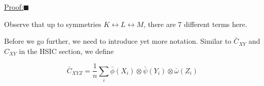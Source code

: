 \documentclass[12pt]{article}
\newenvironment{claimproof}[1]{\par\noindent\underline{Proof:}\space#1}{\hfill $\blacksquare$}
\numberwithin{claim}{section}
\numberwithin{lemma}{section}
\numberwithin{theorem}{section}
\begin{document}
\begin{claimproof}
%
%
\end{claimproof}


Observe that up to symmetries $K\leftrightarrow L \leftrightarrow M$, there are 7 different terms here. 

Before we go further, we need to introduce yet more notation. Similar to $\bar{C}_{XY}$ and $C_{XY}$ in the HSIC section, we define

\[\bar{C}_{XYZ} = \frac{1}{n} \sum_i \bar{\phi}(X_i) \otimes \bar{\psi}(Y_i) \otimes \bar{\omega}(Z_i)\]
\end{document}
